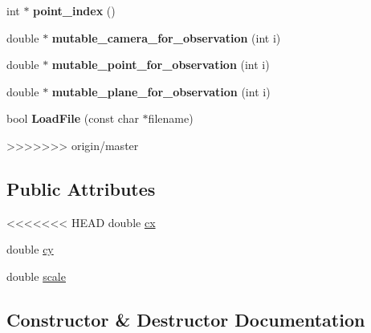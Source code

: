 \begin{DoxyCompactItemize}
\begin{DoxyCompactItemize}
\item 
\hypertarget{classbaProblem_a0dfa9d310b92564faee6c5a98a555f17}{int $\ast$ {\bfseries point\-\_\-index} ()}\label{d0/d13/classbaProblem_a0dfa9d310b92564faee6c5a98a555f17}

\item 
\hypertarget{classbaProblem_ae072d06b4cb8d1ff880b5f8ee97667e5}{double $\ast$ {\bfseries mutable\-\_\-camera\-\_\-for\-\_\-observation} (int i)}\label{d0/d13/classbaProblem_ae072d06b4cb8d1ff880b5f8ee97667e5}

\item 
\hypertarget{classbaProblem_a6ef11eeda5c963bea9afeb2bf22b503a}{double $\ast$ {\bfseries mutable\-\_\-point\-\_\-for\-\_\-observation} (int i)}\label{d0/d13/classbaProblem_a6ef11eeda5c963bea9afeb2bf22b503a}

\item 
\hypertarget{classbaProblem_ae4efd07e572bd96065b3a31981eaf3db}{double $\ast$ {\bfseries mutable\-\_\-plane\-\_\-for\-\_\-observation} (int i)}\label{d0/d13/classbaProblem_ae4efd07e572bd96065b3a31981eaf3db}

\item 
\hypertarget{classbaProblem_afaf36ca131fac1f80dbb5d077d92356c}{bool {\bfseries Load\-File} (const char $\ast$filename)}\label{d0/d13/classbaProblem_afaf36ca131fac1f80dbb5d077d92356c}

>>>>>>> origin/master
\end{DoxyCompactItemize}
\subsection*{Public Attributes}
\begin{DoxyCompactItemize}
\item 
<<<<<<< HEAD
double \hyperlink{classbaProblem_afb2b7b67d532a832a01d385d70495e58}{cx}
\item 
double \hyperlink{classbaProblem_a0715c78d9092ad7eb7e9efcd28fe77a7}{cy}
\item 
double \hyperlink{classbaProblem_afe47c65ed856425239a6648803c98d04}{scale}
\end{DoxyCompactItemize}


\subsection{Constructor \& Destructor Documentation}
\hypertarget{classbaProblem_a8fc465a9e9245a125ae6867881428811}{
}
\end{DoxyCompactItemize}
